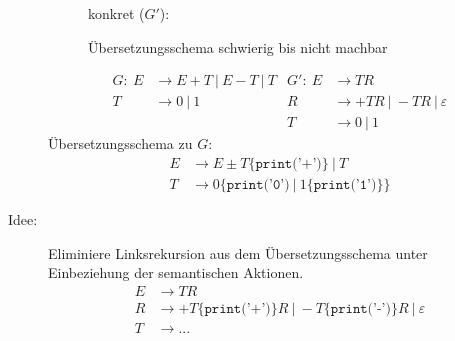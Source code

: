 \begin{description}
\begin{description}
         konkret ($G'$):
         \begin{center}
        \begin{minipage}{0.4\textwidth}
        \end{minipage}
\begin{minipage}{0.4\textwidth}
\end{minipage}\end{center}
Übersetzungsschema schwierig bis nicht machbar
    \end{description}
    \begin{align*}
     G{:}\ E &\to E + T\ |\ E - T\ |\ T & G'{:}\ E &\to T R \\
     T &\to 0\ |\ 1 & R &\to + T R\ |\ - T R\ |\ \varepsilon \\
     && T &\to 0\ |\ 1
    \end{align*}
    Übersetzungsschema zu $G$:
    \begin{align*}
     E &\to E \pm T \{\texttt{print('+')}\}\ |\ T \\
     T &\to 0\{\texttt{print('0')}\ |\ 1\{\texttt{print('1')}\}\}
    \end{align*}
\item[Idee:] Eliminiere Linksrekursion aus dem Übersetzungsschema unter Einbeziehung der semantischen Aktionen.
\begin{align*}
 E &\to TR \\
  R &\to +T \{\texttt{print('+')}\} R\ |\ -T \{\texttt{print('-')}\} R\ |\ \varepsilon \\
  T &\to ...
\end{align*}
\end{description}
